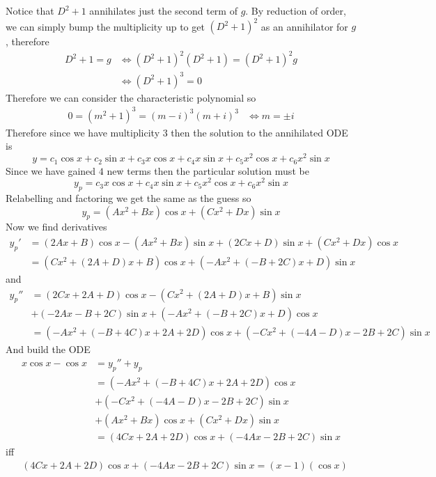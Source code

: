 \documentclass[notes]{subfiles}
\begin{document}
\begin{solution}
    Notice that $D^2 + 1$ annihilates just the second term of $g$. By reduction of order, we can simply bump the multiplicity up to get $(D^2 + 1)^2$ as an annihilator for $g$, therefore
    \begin{align*}
        D^2 + 1 = g
        &\iff (D^2 + 1)^2(D^2 + 1) = (D^2 + 1)^2 g \\
        &\iff (D^2 + 1)^3 = 0
    \end{align*}
    Therefore we can consider the characteristic polynomial so
    \begin{align*}
        0 = (m^2 + 1)^3 = (m - i)^3(m + i)^3
        &\iff m = \pm i
    \end{align*}
    Therefore since we have multiplicity $3$ then the solution to the annihilated ODE is
    \[
        y = c_1\cos x + c_2\sin x + c_3x\cos x + c_4x\sin x + c_5x^2\cos x + c_6x^2\sin x
    \]
    Since we have gained $4$ new terms then the particular solution must be
    \[
        y_p = c_3x\cos x + c_4x\sin x + c_5x^2\cos x + c_6x^2\sin x
    \]
    Relabelling and factoring we get the same as the guess so
    \[
        y_p = (Ax^2 + Bx)\cos x + (Cx^2 + Dx)\sin x
    \]
    Now we find derivatives
    \begin{align*}
        y_p'
        &= (2Ax + B)\cos x - (Ax^2 + Bx)\sin x + (2Cx + D)\sin x + (Cx^2 + Dx)\cos x \\
        &= (Cx^2 + (2A + D)x + B)\cos x + (-Ax^2 + (-B + 2C)x + D)\sin x
    \end{align*}
    and
    \begin{align*}
        y_p''
        &= (2Cx + 2A + D)\cos x - (Cx^2 + (2A + D)x + B)\sin x \\ &+ (-2Ax - B + 2C)\sin x + (-Ax^2 + (-B + 2C)x + D)\cos x \\
        &= (-Ax^2 + (-B + 4C)x + 2A + 2D)\cos x + (-Cx^2 + (-4A - D)x - 2B + 2C)\sin x
    \end{align*}
    And build the ODE
    \begin{align*}
        x\cos x - \cos x
        &= y_p'' + y_p \\
        &= (-Ax^2 + (-B + 4C)x + 2A + 2D)\cos x \\
        &+ (-Cx^2 + (-4A - D)x - 2B + 2C)\sin x \\
        &+ (Ax^2 + Bx)\cos x + (Cx^2 + Dx)\sin x \\
        &= (4Cx + 2A + 2D)\cos x + (-4Ax - 2B + 2C)\sin x
    \end{align*}
    iff
    \begin{align*}
        &(4Cx + 2A + 2D)\cos x + (-4Ax - 2B + 2C)\sin x = (x - 1)(\cos x) \\

\end{align*}
\end{solution}
\end{document}
